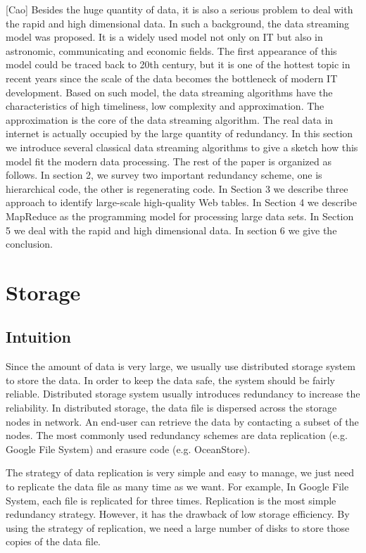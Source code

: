 \documentclass{article} %
\begin{document}
[Cao] Besides the huge quantity of data, it is also a serious problem to deal with the rapid and high dimensional data. In such a background, the data streaming model was proposed. It is a widely used model not only on IT but also in astronomic, communicating and economic fields. The first appearance of this model could be traced back to 20th century, but it is one of the hottest topic in recent years since the scale of the data becomes the bottleneck of modern IT development. Based on such model, the data streaming algorithms have the characteristics of high timeliness, low complexity and approximation. The approximation is the core of the data streaming algorithm. The real data in internet is actually occupied by the large quantity of redundancy. In this section we introduce several classical data streaming algorithms to give a sketch how this model fit the modern data processing.
The rest of the paper is organized as follows. In section 2, we survey two important redundancy scheme, one is hierarchical code, the other is regenerating code. In Section 3 we describe three approach to identify large-scale high-quality Web tables. In Section 4 we describe MapReduce as the programming model for processing large data sets. In Section 5 we deal with the rapid and high dimensional data. In section 6 we give the conclusion.

\section{Storage}
\subsection{Intuition}
Since the amount of data is very large, we usually use distributed storage system to store the data. In order to keep the data safe, the system should be fairly reliable. Distributed storage system usually introduces redundancy to increase the reliability. In distributed storage, the data file is dispersed across the storage nodes in network. An end-user can retrieve the data by contacting a subset of the nodes. The most commonly used redundancy schemes are data replication (e.g. Google File System) and erasure code (e.g. OceanStore).

The strategy of data replication is very simple and easy to manage, we just need to replicate the data file as many time as we want. For example, In Google File System, each file is replicated for three times. Replication is the most simple redundancy strategy. However, it has the drawback of low storage efficiency. By using the strategy of replication, we need a large number of disks to store those copies of the data file.
\end{document}
